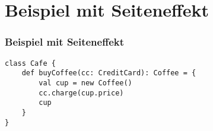 	\section[Section]{Beispiel mit Seiteneffekt}
		\begin{frame}[fragile]
		\frametitle{Beispiel mit Seiteneffekt}
		\begin{lstlisting}[style=myScalastyle]
class Cafe {
	def buyCoffee(cc: CreditCard): Coffee = {
		val cup = new Coffee()
		cc.charge(cup.price)
		cup
	}
}
\end{lstlisting}
\end{frame}
		
			